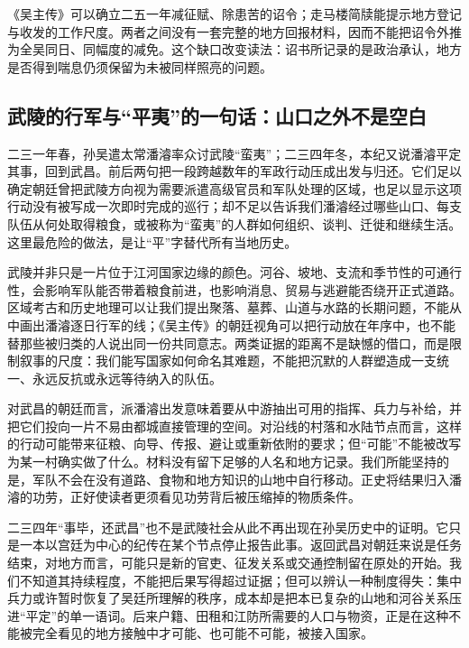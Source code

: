 \begin{sourcenote}
《吴主传》可以确立二五一年减征赋、除患苦的诏令；走马楼简牍能提示地方登记与收发的工作尺度。两者之间没有一套完整的地方回报材料，因而不能把诏令外推为全吴同日、同幅度的减免。这个缺口改变读法：诏书所记录的是政治承认，地方是否得到喘息仍须保留为未被同样照亮的问题。
\end{sourcenote}

\subsection{武陵的行军与“平夷”的一句话：山口之外不是空白}
\label{reader:wu:wuling}
二三一年春，孙吴遣太常潘濬率众讨武陵“蛮夷”；二三四年冬，本纪又说潘濬平定其事，回到武昌。前后两句把一段跨越数年的军政行动压成出发与归还。它们足以确定朝廷曾把武陵方向视为需要派遣高级官员和军队处理的区域，也足以显示这项行动没有被写成一次即时完成的巡行；却不足以告诉我们潘濬经过哪些山口、每支队伍从何处取得粮食，或被称为“蛮夷”的人群如何组织、谈判、迁徙和继续生活。这里最危险的做法，是让“平”字替代所有当地历史。

武陵并非只是一片位于江河国家边缘的颜色。河谷、坡地、支流和季节性的可通行性，会影响军队能否带着粮食前进，也影响消息、贸易与逃避能否绕开正式道路。区域考古和历史地理可以让我们提出聚落、墓葬、山道与水路的长期问题，不能从中画出潘濬逐日行军的线；《吴主传》的朝廷视角可以把行动放在年序中，也不能替那些被归类的人说出同一份共同意志。两类证据的距离不是缺憾的借口，而是限制叙事的尺度：我们能写国家如何命名其难题，不能把沉默的人群塑造成一支统一、永远反抗或永远等待纳入的队伍。

对武昌的朝廷而言，派潘濬出发意味着要从中游抽出可用的指挥、兵力与补给，并把它们投向一片不易由都城直接管理的空间。对沿线的村落和水陆节点而言，这样的行动可能带来征粮、向导、传报、避让或重新依附的要求；但“可能”不能被改写为某一村确实做了什么。材料没有留下足够的人名和地方记录。我们所能坚持的是，军队不会在没有道路、食物和地方知识的山地中自行移动。正史将结果归入潘濬的功劳，正好使读者更须看见功劳背后被压缩掉的物质条件。

二三四年“事毕，还武昌”也不是武陵社会从此不再出现在孙吴历史中的证明。它只是一本以宫廷为中心的纪传在某个节点停止报告此事。返回武昌对朝廷来说是任务结束，对地方而言，可能只是新的官吏、征发关系或交通控制留在原处的开始。我们不知道其持续程度，不能把后果写得超过证据；但可以辨认一种制度得失：集中兵力或许暂时恢复了吴廷所理解的秩序，成本却是把本已复杂的山地和河谷关系压进“平定”的单一语词。后来户籍、田租和江防所需要的人口与物资，正是在这种不能被完全看见的地方接触中才可能、也可能不可能，被接入国家。

